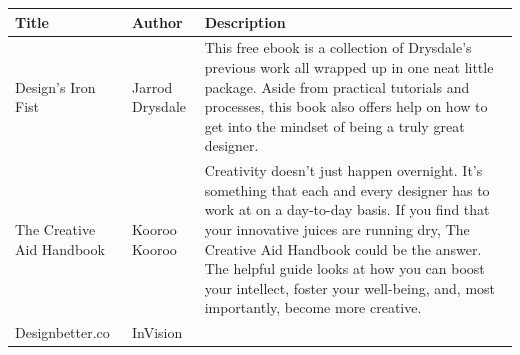 \documentclass[]{book}
\theoremstyle{definition}
\theoremstyle{definition}
\theoremstyle{definition}
\theoremstyle{remark}
\begin{document}
\begin{longtable}[]{@{}lll@{}}
\toprule
\begin{minipage}[b]{0.08\columnwidth}\raggedright\strut
Title\strut
\end{minipage} & \begin{minipage}[b]{0.11\columnwidth}\raggedright\strut
Author\strut
\end{minipage} & \begin{minipage}[b]{0.72\columnwidth}\raggedright\strut
Description\strut
\end{minipage}\tabularnewline
\midrule
\endhead
\begin{minipage}[t]{0.08\columnwidth}\raggedright\strut
Design's Iron Fist\strut
\end{minipage} & \begin{minipage}[t]{0.11\columnwidth}\raggedright\strut
Jarrod Drysdale\strut
\end{minipage} & \begin{minipage}[t]{0.72\columnwidth}\raggedright\strut
This free ebook is a collection of Drysdale's previous work all wrapped
up in one neat little package. Aside from practical tutorials and
processes, this book also offers help on how to get into the mindset of
being a truly great designer.\strut
\end{minipage}\tabularnewline
\begin{minipage}[t]{0.08\columnwidth}\raggedright\strut
The Creative Aid Handbook\strut
\end{minipage} & \begin{minipage}[t]{0.11\columnwidth}\raggedright\strut
Kooroo Kooroo\strut
\end{minipage} & \begin{minipage}[t]{0.72\columnwidth}\raggedright\strut
Creativity doesn't just happen overnight. It's something that each and
every designer has to work at on a day-to-day basis. If you find that
your innovative juices are running dry, The Creative Aid Handbook could
be the answer. The helpful guide looks at how you can boost your
intellect, foster your well-being, and, most importantly, become more
creative.\strut
\end{minipage}\tabularnewline
\begin{minipage}[t]{0.08\columnwidth}\raggedright\strut
Designbetter.co\strut
\end{minipage} & \begin{minipage}[t]{0.11\columnwidth}\raggedright\strut
InVision\strut
\end{minipage} & \begin{minipage}[t]{0.72\columnwidth}\raggedright\strut

\end{minipage}
\end{longtable}
\end{document}
